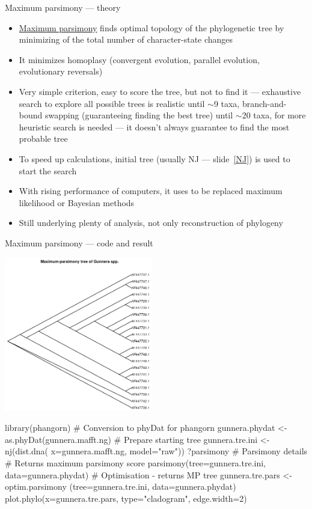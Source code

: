 \documentclass[compress, ucs, xelatex, 11pt, xcolor=svgnames, aspectratio=169,
	hyperref={
		bookmarks=true,
		unicode=true,
		colorlinks=true,
		pdftitle={Molecular data in R},
		plainpages=false,
		pdfauthor={Vojtech Zeisek},
		pdfsubject={Course about phylogeny and evolution in R},
		pdfcreator={XeLaTeX},
		pdfkeywords={R, evolution, phylogeny, molecular data},
		linkcolor=Crimson, %
		anchorcolor=Magenta, %
		citecolor=Magenta, %
		filecolor=Magenta, %
		menucolor=Magenta, %
		urlcolor=DodgerBlue, %
		pdftex},
	url={hyphens, lowtilde} %
	]{beamer}
\begin{document}
\begin{frame}{Maximum parsimony --- theory}
	\label{MP}
	\begin{itemize}
		\item \href{https://en.wikipedia.org/wiki/Maximum_parsimony_(phylogenetics)}{Maximum parsimony} finds optimal topology of the phylogenetic tree by minimizing of the total number of character-state changes
		\item It minimizes homoplasy (convergent evolution, parallel evolution, evolutionary reversals)
		\item Very simple criterion, easy to score the tree, but not to find it --- exhaustive search to explore all possible trees is realistic until $\sim$9 taxa, branch-and-bound swapping (guaranteeing finding the best tree) until $\sim$20 taxa, for more heuristic search is needed --- it doesn't always guarantee to find the most probable tree
		\item To speed up calculations, initial tree (usually NJ --- slide~\ref{NJ}) is used to start the search
		\item With rising performance of computers, it uses to be replaced maximum likelihood or Bayesian methods
		\item Still underlying plenty of analysis, not only reconstruction of phylogeny
	\end{itemize}
\end{frame}

\begin{frame}[fragile]{Maximum parsimony --- code and result}
	\begin{multicols}{2}
		\includegraphics[height=6.75cm]{parsimony.png}
		\begin{spluscode}
    library(phangorn)
    # Conversion to phyDat for phangorn
    gunnera.phydat <-
      as.phyDat(gunnera.mafft.ng)
    # Prepare starting tree
    gunnera.tre.ini <- nj(dist.dna(
      x=gunnera.mafft.ng, model="raw"))
    ?parsimony # Parsimony details
    # Returns maximum parsimony score
    parsimony(tree=gunnera.tre.ini,
      data=gunnera.phydat)
    # Optimisation - returns MP tree
    gunnera.tre.pars <- optim.parsimony
      (tree=gunnera.tre.ini,
      data=gunnera.phydat)
    plot.phylo(x=gunnera.tre.pars,
      type="cladogram", edge.width=2)
		\end{spluscode}
	\end{multicols}
\end{frame}
\end{document}
